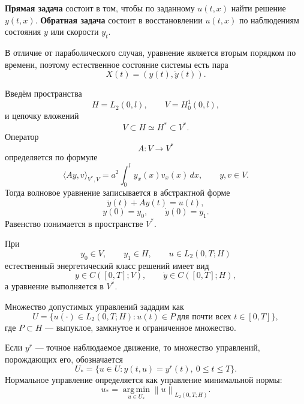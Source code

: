 \documentclass[12pt,a4paper]{article}
\newcommand{\dd}{\,d}
\newcommand{\norm}[1]{\left\lVert #1\right\rVert}
\begin{document}
\textbf{Прямая задача} состоит в том, чтобы по заданному $u(t,x)$ найти решение $y(t,x)$. \textbf{Обратная задача} состоит в восстановлении $u(t,x)$ по наблюдениям состояния $y$ или скорости $y_t$.

В отличие от параболического случая, уравнение является вторым порядком по времени, поэтому естественное состояние системы есть пара
\begin{equation}
    X(t)=(y(t),\dot y(t)).
\end{equation}

Введём пространства
\[
    H=L_2(0,l),\qquad V=H_0^1(0,l),
\]
и цепочку вложений
\begin{equation}
    V\subset H\simeq H^*\subset V^*.
\end{equation}
Оператор
\[
    A:V\to V^*
\]
определяется по формуле
\begin{equation}
    \langle Ay,v\rangle_{V^*,V}
    =a^2\int_0^l y_x(x)v_x(x)\dd x,
    \qquad y,v\in V.
\end{equation}
Тогда волновое уравнение записывается в абстрактной форме
\begin{equation}
    \ddot y(t)+Ay(t)=u(t),
\end{equation}
\begin{equation}
    y(0)=y_0,
    \qquad \dot y(0)=y_1.
\end{equation}
Равенство понимается в пространстве $V^*$.

При
\[
    y_0\in V,
    \qquad y_1\in H,
    \qquad u\in L_2(0,T;H)
\]
естественный энергетический класс решений имеет вид
\begin{equation}
    y\in C([0,T];V),
    \qquad \dot y\in C([0,T];H),
\end{equation}
а уравнение выполняется в $V^*$.

Множество допустимых управлений зададим как
\begin{equation}
    U=\{u(\cdot)\in L_2(0,T;H): u(t)\in P\ \text{для почти всех }t\in[0,T]\},
\end{equation}
где $P\subset H$ --- выпуклое, замкнутое и ограниченное множество.

Если $y^r$ --- точное наблюдаемое движение, то множество управлений, порождающих его, обозначается
\begin{equation}
    U_* = \{u\in U:y(t,u)=y^r(t),\ 0\le t\le T\}.
\end{equation}
Нормальное управление определяется как управление минимальной нормы:
\begin{equation}
    u_* = \operatorname*{arg\,min}_{u\in U_*}\norm{u}_{L_2(0,T;H)}.
\end{equation}
\end{document}
